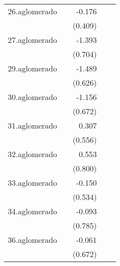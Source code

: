 {\begin{longtable}{l*{4}{D{.}{.}{-1}}}
\addlinespace
26.aglomerado&                     &      -0.176         &                     &                     \\
            &                     &     (0.409)         &                     &                     \\
\addlinespace
27.aglomerado&                     &      -1.393\sym{*}  &                     &                     \\
            &                     &     (0.704)         &                     &                     \\
\addlinespace
29.aglomerado&                     &      -1.489\sym{*}  &                     &                     \\
            &                     &     (0.626)         &                     &                     \\
\addlinespace
30.aglomerado&                     &      -1.156         &                     &                     \\
            &                     &     (0.672)         &                     &                     \\
\addlinespace
31.aglomerado&                     &       0.307         &                     &                     \\
            &                     &     (0.556)         &                     &                     \\
\addlinespace
32.aglomerado&                     &       0.553         &                     &                     \\
            &                     &     (0.800)         &                     &                     \\
\addlinespace
33.aglomerado&                     &      -0.150         &                     &                     \\
            &                     &     (0.534)         &                     &                     \\
\addlinespace
34.aglomerado&                     &      -0.093         &                     &                     \\
            &                     &     (0.785)         &                     &                     \\
\addlinespace
36.aglomerado&                     &      -0.061         &                     &                     \\
            &                     &     (0.672)         &                     &                     \\

\end{longtable}}
